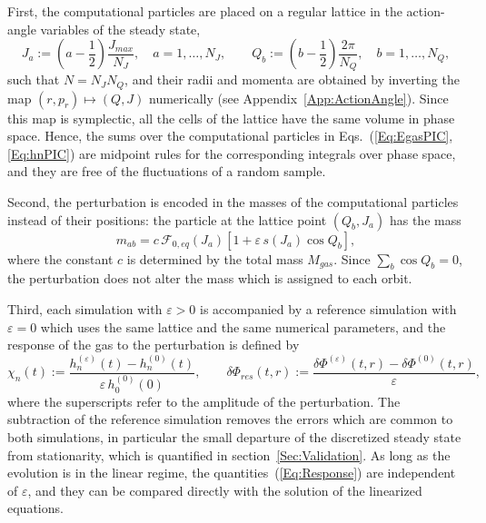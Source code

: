 First, the computational particles are placed on a regular lattice in the action-angle variables of the steady state,
\begin{equation}
J_a := \left( a - \frac{1}{2} \right)\frac{J_{max}}{N_J},\quad a = 1,\ldots,N_J,\qquad
Q_b := \left( b - \frac{1}{2} \right)\frac{2\pi}{N_Q},\quad b = 1,\ldots,N_Q,
\label{Eq:Lattice}
\end{equation}
such that $N = N_J N_Q$, and their radii and momenta are obtained by inverting the map $(r,p_r)\mapsto (Q,J)$ numerically (see Appendix~\ref{App:ActionAngle}). Since this map is symplectic, all the cells of the lattice have the same volume in phase space. Hence, the sums over the computational particles in Eqs.~(\ref{Eq:EgasPIC},\ref{Eq:hnPIC}) are midpoint rules for the corresponding integrals over phase space, and they are free of the fluctuations of a random sample.

Second, the perturbation is encoded in the masses of the computational particles instead of their positions: the particle at the lattice point $(Q_b,J_a)$ has the mass
\begin{equation}
m_{ab} = c\,\mathcal{F}_{0,eq}(J_a)\left[ 1 + \varepsilon\, s(J_a)\cos Q_b \right],
\label{Eq:Masses}
\end{equation}
where the constant $c$ is determined by the total mass $M_{gas}$. Since $\sum_b \cos Q_b = 0$, the perturbation does not alter the mass which is assigned to each orbit.

Third, each simulation with $\varepsilon > 0$ is accompanied by a reference simulation with $\varepsilon = 0$ which uses the same lattice and the same numerical parameters, and the response of the gas to the perturbation is defined by
\begin{equation}
\chi_n(t) := \frac{h_n^{(\varepsilon)}(t) - h_n^{(0)}(t)}{\varepsilon\, h_0^{(0)}(0)},\qquad
\delta\Phi_{res}(t,r) := \frac{\delta\Phi^{(\varepsilon)}(t,r) - \delta\Phi^{(0)}(t,r)}{\varepsilon},
\label{Eq:Response}
\end{equation}
where the superscripts refer to the amplitude of the perturbation. The subtraction of the reference simulation removes the errors which are common to both simulations, in particular the small departure of the discretized steady state from stationarity, which is quantified in section~\ref{Sec:Validation}. As long as the evolution is in the linear regime, the quantities~(\ref{Eq:Response}) are independent of $\varepsilon$, and they can be compared directly with the solution of the linearized equations.


